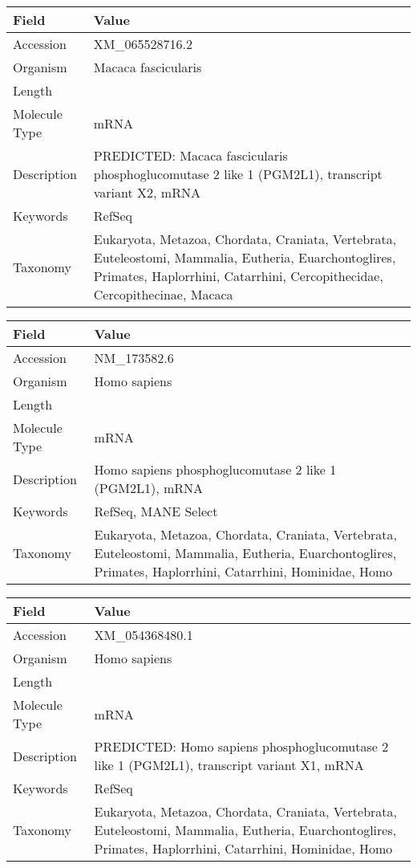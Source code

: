 \documentclass[10pt]{article}
\begin{document}
\vspace{1em}
{\footnotesize
\begin{longtable}{>{\raggedright\arraybackslash}p{4.5cm} >{\raggedright\arraybackslash}p{11.5cm}}
\textbf{Field} & \textbf{Value} \\
\hline
Accession & XM\_065528716.2 \\
Organism & Macaca fascicularis \\
Length & 3587 \\
Molecule Type & mRNA \\
Description & PREDICTED: Macaca fascicularis phosphoglucomutase 2 like 1 (PGM2L1), transcript variant X2, mRNA \\
Keywords & RefSeq \\
Taxonomy & Eukaryota, Metazoa, Chordata, Craniata, Vertebrata, Euteleostomi, Mammalia, Eutheria, Euarchontoglires, Primates, Haplorrhini, Catarrhini, Cercopithecidae, Cercopithecinae, Macaca \\
\end{longtable}
}

\vspace{1em}
{\footnotesize
\begin{longtable}{>{\raggedright\arraybackslash}p{4.5cm} >{\raggedright\arraybackslash}p{11.5cm}}
\textbf{Field} & \textbf{Value} \\
\hline
Accession & NM\_173582.6 \\
Organism & Homo sapiens \\
Length & 8477 \\
Molecule Type & mRNA \\
Description & Homo sapiens phosphoglucomutase 2 like 1 (PGM2L1), mRNA \\
Keywords & RefSeq, MANE Select \\
Taxonomy & Eukaryota, Metazoa, Chordata, Craniata, Vertebrata, Euteleostomi, Mammalia, Eutheria, Euarchontoglires, Primates, Haplorrhini, Catarrhini, Hominidae, Homo \\
\end{longtable}
}

\vspace{1em}
{\footnotesize
\begin{longtable}{>{\raggedright\arraybackslash}p{4.5cm} >{\raggedright\arraybackslash}p{11.5cm}}
\textbf{Field} & \textbf{Value} \\
\hline
Accession & XM\_054368480.1 \\
Organism & Homo sapiens \\
Length & 8544 \\
Molecule Type & mRNA \\
Description & PREDICTED: Homo sapiens phosphoglucomutase 2 like 1 (PGM2L1), transcript variant X1, mRNA \\
Keywords & RefSeq \\
Taxonomy & Eukaryota, Metazoa, Chordata, Craniata, Vertebrata, Euteleostomi, Mammalia, Eutheria, Euarchontoglires, Primates, Haplorrhini, Catarrhini, Hominidae, Homo \\
\end{longtable}
}
\end{document}
